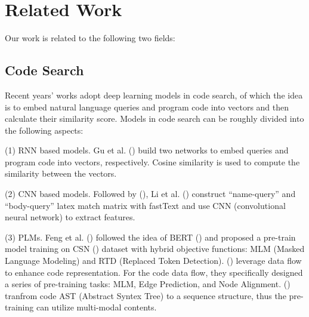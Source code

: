 
\section{Related Work}

Our work is related to the following two fields: 

\subsection{Code Search}
Recent years’ works adopt deep learning models in code search, 
of which the idea is to embed natural language queries and program code into vectors 
and then calculate their similarity score. Models in code search can be roughly 
divided into the following aspects:

(1) RNN based models. Gu et al. (\citealp{DeepCS})
build two networks to embed queries and program code into vectors, respectively. 
Cosine similarity is used to compute the similarity between the vectors. 

(2) CNN based models. Followed by (\citealp{DeepCS}), Li et al. (\citealp{CQIL}) construct “name-query” 
and “body-query” latex match matrix with fastText and use 
CNN (convolutional neural network) to extract features.  

(3) PLMs. Feng et al. (\citealp{CodeBERT}) followed the idea of BERT (\citealp{BERT}) 
and proposed a pre-train model training on CSN (\citealp{CodeSearchNet}) 
dataset with hybrid objective functions: MLM (Masked Language Modeling) 
and RTD (Replaced Token Detection). (\citealp{GraphCodeBERT}) leverage data flow to 
enhance code representation. 
For the code data flow, they specifically designed a series of pre-training tasks: 
MLM, Edge Prediction, and Node Alignment. (\citealp{UniXcoder}) 
tranfrom code AST (Abstract Syntex Tree) to a sequence structure, 
thus the pre-training can utilize multi-modal contents. 




